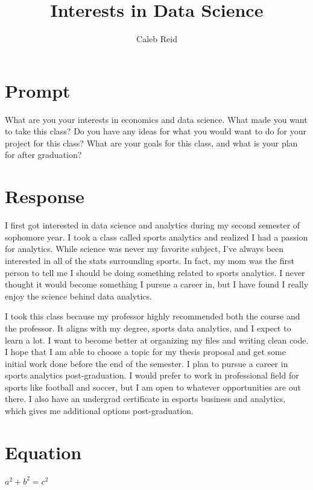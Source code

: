 \documentclass{article}
\title{Interests in Data Science}
\author{Caleb Reid}
\begin{document}
\maketitle
\section{Prompt}
 What are you  your interests in economics and data science. What made you want to take this class?
Do you have any ideas for what you would want to do for your project for this class? 
What are your goals for this class, and what is your plan for after graduation? 

\section{Response}
I first got interested in data science and analytics during my second semester of sophomore year. I took a class called sports analytics and realized I had a passion for analytics. While science was never my favorite subject, I've always been interested in all of the stats surrounding sports. In fact, my mom was the first person to tell me I should be doing something related to sports analytics. I never thought it would become something I pursue a career in, but I have found I really enjoy the science behind data analytics.

I took this class because my professor highly recommended both the course and the professor. It aligns with my degree, sports data analytics, and I expect to learn a lot. I want to become better at organizing my files and writing clean code. I hope that I am able to choose a topic for my thesis proposal and get some initial work done before the end of the semester. I plan to pursue a career in sports analytics post-graduation. I would prefer to work in professional field for sports like football and soccer, but I am open to whatever opportunities are out there. I also have an undergrad certificate in esports business and analytics, which gives me additional options post-graduation. 

\section{Equation}

\(a^2 + b^2 = c^2\)
\end{document}
